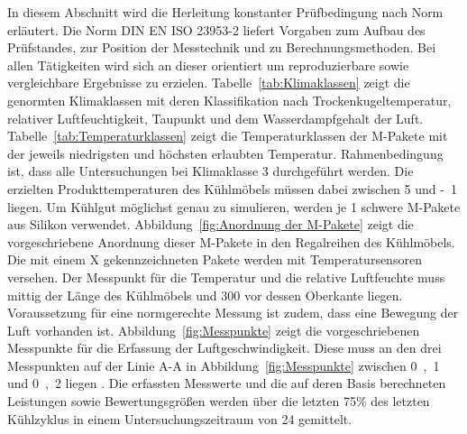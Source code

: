 In diesem Abschnitt wird die Herleitung konstanter Prüfbedingung nach Norm erläutert.
Die Norm DIN EN ISO 23953-2 liefert Vorgaben zum Aufbau des Prüfstandes, zur Position der Messtechnik und zu Berechnungsmethoden. Bei allen Tätigkeiten wird sich an dieser orientiert um reproduzierbare sowie vergleichbare Ergebnisse zu erzielen.
Tabelle~\ref{tab:Klimaklassen} zeigt die genormten Klimaklassen mit deren Klassifikation nach Trockenkugeltemperatur, relativer Luftfeuchtigkeit, Taupunkt und dem Wasserdampfgehalt der Luft. Tabelle~\ref{tab:Temperaturklassen} zeigt die Temperaturklassen der M-Pakete mit der jeweils niedrigsten und höchsten erlaubten Temperatur. Rahmenbedingung ist, dass alle Untersuchungen bei Klimaklasse 3 durchgeführt werden. Die erzielten Produkttemperaturen des Kühlmöbels müssen dabei zwischen \unit{5}{\celsius} und \unit{-1}{\celsius} liegen. \newline
Um Kühlgut möglichst genau zu simulieren, werden je \unit{1}{\kilogram} schwere M-Pakete aus Silikon verwendet. Abbildung~\ref{fig:Anordnung der M-Pakete} zeigt die vorgeschriebene Anordnung dieser M-Pakete in den Regalreihen des Kühlmöbels. Die mit einem X gekennzeichneten Pakete werden mit Temperatursensoren versehen.
Der Messpunkt für die Temperatur und die relative Luftfeuchte muss mittig der Länge des Kühlmöbels und \unit{300}{\milli\metre} vor dessen Oberkante liegen. \newline
Voraussetzung für eine normgerechte Messung ist zudem, dass eine Bewegung der Luft vorhanden ist. Abbildung~\ref{fig:Messpunkte} zeigt die vorgeschriebenen Messpunkte für die Erfassung der Luftgeschwindigkeit. Diese muss an den drei Messpunkten auf der Linie A-A in Abbildung~\ref{fig:Messpunkte} zwischen \unit{0,1}{\meter\per\second} und \unit{0,2}{\meter\per\second} liegen \cite{DINDeutschesInstitutfurNormunge.V..}. \newline
Die erfassten Messwerte und die auf deren Basis berechneten Leistungen sowie Bewertungsgrößen werden über die letzten \unit{75}{\%} des letzten Kühlzyklus in einem Untersuchungszeitraum von \unit{24}{\hour} gemittelt.





